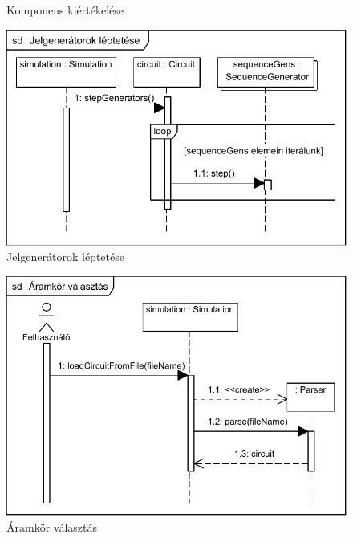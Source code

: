 \begin{figure}[H]
\begin{center}
\caption{Komponens kiértékelése}
\label{fig:component_sim}
\end{center}
\end{figure}

\begin{figure}[H]
\begin{center}
\includegraphics{chapters/chapter04/seqdiagrams/jelgeneratorok_leptetese.pdf}
\caption{Jelgenerátorok léptetése}
\label{fig:step_gens}
\end{center}
\end{figure}

\begin{figure}[H]
\begin{center}
\includegraphics{chapters/chapter04/seqdiagrams/aramkor_valasztas.pdf}
\caption{Áramkör választás}
\label{fig:aramkor_valasztas}
\end{center}
\end{figure}

